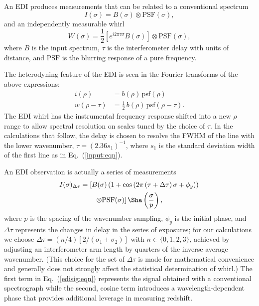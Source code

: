 \documentclass[preprint2, 10pt]{aastex}
\begin{document}
An EDI produces measurements that can be related
to a conventional spectrum
\begin{equation}
I(\sigma) = B(\sigma) \otimes \mbox{PSF}(\sigma),
\end{equation}
and an independently measurable whirl
\begin{equation}
W(\sigma) = \frac{1}{2}\left[e^{i2\pi\tau\sigma}B(\sigma)\right] \otimes \mbox{PSF}(\sigma),
\end{equation}
where $B$ is the input spectrum, $\tau$ is the interferometer delay
with units of distance, and $\mbox{PSF}$  is the blurring
response of a pure frequency.

The heterodyning feature of the EDI is seen in the Fourier transforms of the above expressions:
\begin{align}
i(\rho) & =b(\rho) \, \mbox{psf}(\rho)\\
w(\rho -\tau) & =\frac{1}{2}\, b(\rho) \, \mbox{psf}(\rho-\tau).
\end{align}
The EDI whirl has the instrumental frequency response shifted into a new $\rho$ range to allow
spectral
resolution on scales tuned by the choice of $\tau$.  In the calculations that follow, the delay is chosen to resolve
the FWHM of the line with the lower wavenumber, $\tau = (2.36s_1)^{-1}$, where $s_1$ 
is the standard deviation width of the first line as 
in Eq.~(\ref{input:eqn}). 

An EDI observation is actually a series of measurements
\begin{align}
I(\sigma)_{\Delta\tau} &= \left[B(\sigma)\left(1+\cos{\left(2\pi\left(\tau+\Delta \tau\right)\sigma+\phi_y \right)} \right) \right. \nonumber\\
&\qquad \left. \otimes \mbox{PSF}(\sigma)\right]\Sha\left(\frac{\sigma}{p}\right),
\label{edisig:eqn}
\end{align}
where $p$ is the spacing of the wavenumber sampling, $\phi_y$ is the initial phase,
and $\Delta \tau$ represents the changes in delay in the series of exposures; for our calculations we choose  $\Delta \tau = (n/4)[2/(\sigma_1+\sigma_2)]$ with $n\in\{0,1,2,3\}$, 
achieved by adjusting an interferometer arm length by quarters 
of the inverse average wavenumber. 
(This choice for the set of  $\Delta \tau$ is made for mathematical convenience and generally does not strongly affect the statistical determination of whirl.) 
The first term in Eq.~(\ref{edisig:eqn}) represents the signal obtained with a conventional spectrograph while the second, cosine term
introduces a wavelength-dependent phase that provides additional leverage in measuring redshift.
\end{document}
